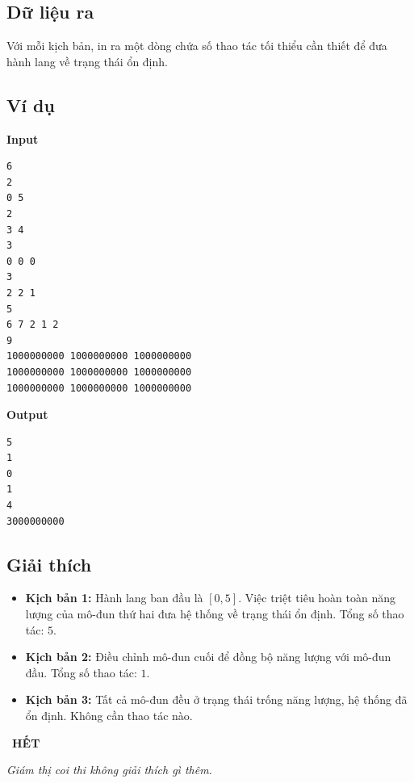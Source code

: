\subsection*{Dữ liệu ra}

Với mỗi kịch bản, in ra một dòng chứa số thao tác tối thiểu cần thiết để đưa hành lang về trạng thái ổn định.

\subsection*{Ví dụ}

\noindent
\begin{minipage}[t]{0.48\textwidth}
\textbf{Input}
\begin{verbatim}
6
2
0 5
2
3 4
3
0 0 0
3
2 2 1
5
6 7 2 1 2
9
1000000000 1000000000 1000000000
1000000000 1000000000 1000000000
1000000000 1000000000 1000000000
\end{verbatim}
\end{minipage}
\hfill
\begin{minipage}[t]{0.48\textwidth}
\textbf{Output}
\begin{verbatim}
5
1
0
1
4
3000000000
\end{verbatim}
\end{minipage}

\subsection*{Giải thích}

\begin{itemize}
    \item \textbf{Kịch bản 1:}  
    Hành lang ban đầu là $[0, 5]$.  
    Việc triệt tiêu hoàn toàn năng lượng của mô-đun thứ hai đưa hệ thống về trạng thái ổn định.  
    Tổng số thao tác: $5$.

    \item \textbf{Kịch bản 2:}  
    Điều chỉnh mô-đun cuối để đồng bộ năng lượng với mô-đun đầu.  
    Tổng số thao tác: $1$.

    \item \textbf{Kịch bản 3:}  
    Tất cả mô-đun đều ở trạng thái trống năng lượng, hệ thống đã ổn định.  
    Không cần thao tác nào.
\end{itemize}

\bigskip
\begin{center}
\ \textbf{HẾT}\ 

\noindent
\textit{Giám thị coi thi không giải thích gì thêm.}
\end{center}

